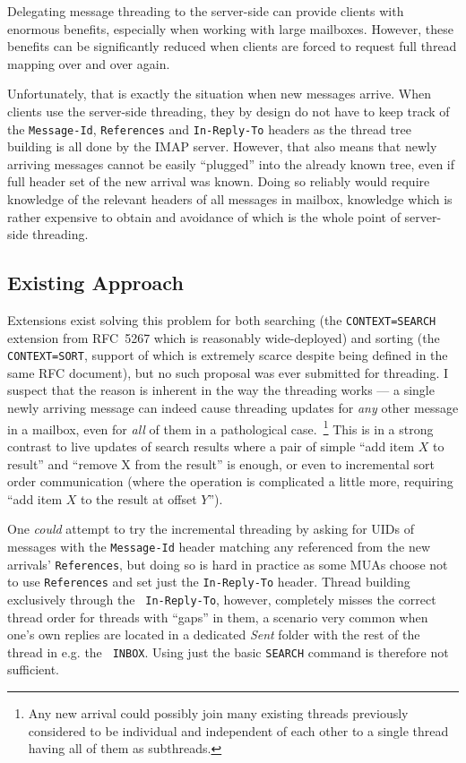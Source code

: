 \documentclass[trojita]{subfiles}
\begin{document}
Delegating message threading to the server-side can provide clients with enormous benefits, especially when working with
large mailboxes.  However, these benefits can be significantly reduced when clients are forced to request full thread
mapping over and over again.

Unfortunately, that is exactly the situation when new messages arrive.  When clients use the server-side threading, they
by design do not have to keep track of the {\tt Message-Id}, {\tt References} and {\tt In-Reply-To} headers as the
thread tree building is all done by the IMAP server.  However, that also means that newly arriving messages cannot be
easily ``plugged'' into the already known tree, even if full header set of the new arrival was known.  Doing so reliably
would require knowledge of the relevant headers of all messages in mailbox, knowledge which is rather expensive to
obtain and avoidance of which is the whole point of server-side threading.

\subsection{Existing Approach}

Extensions exist solving this problem for both searching (the {\tt CONTEXT=SEARCH} extension from RFC~5267
\cite{rfc5267} which is reasonably wide-deployed) and sorting (the {\tt CONTEXT=SORT}, support of which is extremely
scarce despite being defined in the same RFC document), but no such proposal was ever submitted for threading.  I
suspect that the reason is inherent in the way the threading works --- a single newly arriving message can indeed cause
threading updates for {\em any} other message in a mailbox, even for {\em all} of them in a pathological
case.~\footnote{Any new arrival could possibly join many existing threads previously considered to be individual and
independent of each other to a single thread having all of them as subthreads.}  This is in a strong contrast to live
updates of search results where a pair of simple ``add item $X$ to result'' and ``remove X from the result'' is enough,
or even to incremental sort order communication (where the operation is complicated a little more, requiring ``add item
$X$ to the result at offset $Y$'').

One {\em could} attempt to try the incremental threading by asking for UIDs of messages with the {\tt Message-Id} header
matching any referenced from the new arrivals' {\tt References}, but doing so is hard in practice as some MUAs choose
not to use {\tt References} and set just the {\tt In-Reply-To} header.  Thread building exclusively through the {\tt
In-Reply-To}, however, completely misses the correct thread order for threads with ``gaps'' in them, a scenario very
common when one's own replies are located in a dedicated {\em Sent} folder with the rest of the thread in e.g. the {\tt
INBOX}.  Using just the basic {\tt SEARCH} command is therefore not sufficient.
\end{document}
